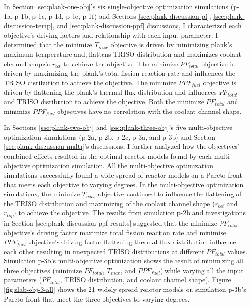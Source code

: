In Section \ref{sec:plank-one-obj}'s six single-objective optimization simulations
(p-1a, p-1b, p-1c, p-1d, p-1e, p-1f) and Sections \ref{sec:plank-discussion-pf}, 
\ref{sec:plank-discussion-temp}, and \ref{sec:plank-discussion-ppf} discussions,    
I characterized each objective's driving factors and relationship with each input 
parameter. 
I determined that the minimize $T_{max}$ objective is driven by minimizing plank's maximum 
temperature and, flattens TRISO distribution and maximizes coolant channel shape's 
$r_{tot}$ to achieve the objective. 
The minimize $PF_{total}$ objective is driven by maximizing the plank's total fission 
reaction rate and influences the TRISO disribution to achieve the objective. 
The minimize $PPF_{fuel}$ objective is driven by flattening the plank's thermal flux
distribution and influences $PF_{total}$ and TRISO disribution to achieve the objective. 
Both the minimize $PF_{total}$ and minimize $PPF_{fuel}$ objectives have no correlation 
with the coolant channel shape. 

In Sections \ref{sec:plank-two-obj} and \ref{sec:plank-three-obj}'s five multi-objective 
optimization simulations (p-2a, p-2b, p-2c, p-3a, and p-3b) and Section 
\ref{sec:plank-discussion-multi}'s discussions, I further analyzed how the objectives' 
combined effects resulted in the optimal reactor models found by each multi-objective 
optimization simulation. 
All the multi-objective optimization simulations successfully found a wide spread of 
reactor models on a Pareto front that meets each objective to varying degrees. 
In the multi-objective optimization simulations, the minimize $T_{max}$ objective 
continued to influence the flattening of the TRISO distribution and maximizing of the 
coolant channel shape ($r_{bot}$ and $r_{top}$) to achieve the objective. 
The results from simulation p-2b and investigations in Section 
\ref{sec:plank-discussion-ppf-results} suggested that the minimize $PF_{total}$ 
objective's driving factor maximize total fission reaction rate and 
minimize $PPF_{fuel}$ objective's driving factor flattening thermal flux distribution 
influence each other resulting in unexpected TRISO distributions at different 
$PF_{total}$ values. 
Simulation p-3b's multi-objective optimization shows the result of minimizing all 
three objectives (minimize $PF_{total}$, $T_{max}$, and $PPF_{fuel}$) while varying 
all the input parameters ($PF_{total}$, TRISO distribution, and coolant channel shape).
Figure \ref{fig:slab-obj-3-all} shows the 21 widely spread reactor models on simulation 
p-3b's Pareto front that meet the three objectives to varying degrees. 

